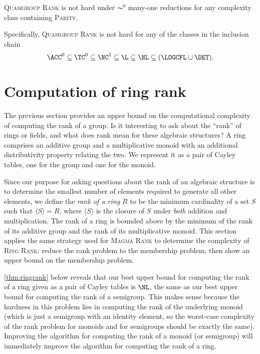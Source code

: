 \documentclass{article}
\newcommand{\gen}[1]{\langle #1 \rangle}
\begin{document}
\begin{theorem}
  \textsc{Quasigroup Rank} is not hard under $\AC^0$ many-one reductions for any complexity class containing \textsc{Parity}.
\end{theorem}

Specifically, \textsc{Quasigroup Rank} is not hard for any of the classes in the inclusion chain
\begin{equation*}
  \ACC^0 \subseteq \TC^0 \subseteq \NC^1 \subseteq \L \subseteq \NL \subseteq (\LOGCFL \cup \DET).
\end{equation*}

\section{Computation of ring rank}
%
The previous section provides an upper bound on the computational complexity of computing the rank of a group.
Is it interesting to ask about the ``rank'' of rings or fields, and what does rank mean for these algebraic structures?
A ring comprises an additive group and a multiplicative monoid with an additional distributivity property relating the two.
We represent it as a pair of Cayley tables, one for the group and one for the monoid.

Since our purpose for asking questions about the rank of an algebraic structure is to determine the smallest number of elements required to generate all other elements, we define the \emph{rank of a ring $R$} to be the minimum cardinality of a set $S$ such that $\gen{S} = R$, where $\gen{S}$ is the closure of $S$ under \emph{both} addition and multiplication.
The rank of a ring is bounded above by the minimum of the rank of its additive group and the rank of its multiplicative monoid.  %
This section applies the same strategy used for \textsc{Magma Rank} to determine the complexity of \textsc{Ring Rank}: reduce the rank problem to the membership problem, then show an upper bound on the membership problem.

%
\autoref{thm:ringrank} below reveals that our best upper bound for computing the rank of a ring given as a pair of Cayley tables is $\NL$, the same as our best upper bound for computing the rank of a semigroup.
This makes sense because the hardness in this problem lies in computing the rank of the underlying monoid (which is just a semigroup with an identity element, so the worst-case complexity of the rank problem for monoids and for semigroups should be exactly the same).
Improving the algorithm for computing the rank of a monoid (or semigroup) will immediately improve the algorithm for computing the rank of a ring.
\end{document}
